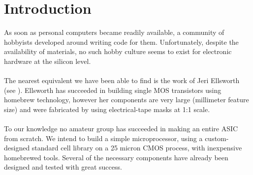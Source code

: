 \section{Introduction}

\paragraph*{}
As soon as personal computers became readily available, a community of hobbyists developed around writing code for them.
Unfortunately, despite the availability of materials, no such hobby culture seems to exist for electronic hardware at the 
silicon level.

\paragraph*{}
The nearest equivalent we have been able to find is the work of Jeri Ellsworth (see \cite{ellsworth}). Ellsworth has succeeded
in building single MOS transistors using homebrew technology, however her components are very large (millimeter feature size)
and were fabricated by using electrical-tape masks at 1:1 scale.

\paragraph*{}
To our knowledge no amateur group has succeeded in making an entire ASIC from scratch. We intend to build a simple
microprocessor, using a custom-designed standard cell library on a 25 micron CMOS process, with inexpensive homebrewed tools.
Several of the necessary components have already been designed and tested with great success.
